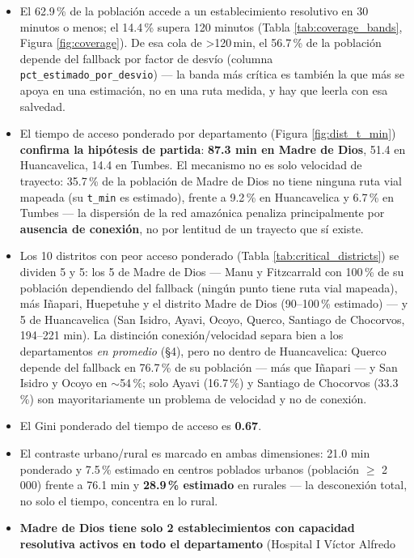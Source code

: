\documentclass[11pt]{article}
\begin{document}
\begin{itemize}
\item El 62.9\,\% de la población accede a un establecimiento resolutivo en
  30 minutos o menos; el 14.4\,\% supera 120 minutos (Tabla
  \ref{tab:coverage_bands}, Figura \ref{fig:coverage}). De esa cola de
  >120\,min, el 56.7\,\% de la población depende del fallback por factor de
  desvío (columna \texttt{pct\_estimado\_por\_desvio}) --- la banda más
  crítica es también la que más se apoya en una estimación, no en una ruta
  medida, y hay que leerla con esa salvedad.
\item El tiempo de acceso ponderado por departamento (Figura
  \ref{fig:dist_t_min}) \textbf{confirma la hipótesis de partida}:
  \textbf{87.3 min en Madre de Dios}, 51.4 en Huancavelica, 14.4 en Tumbes.
  El mecanismo no es solo velocidad de
  trayecto: 35.7\,\% de la población de Madre de Dios no tiene ninguna ruta
  vial mapeada (su \texttt{t\_min} es estimado), frente a 9.2\,\% en
  Huancavelica y 6.7\,\% en Tumbes --- la dispersión de la red amazónica
  penaliza principalmente por \textbf{ausencia de conexión}, no por
  lentitud de un trayecto que sí existe.
\item Los 10 distritos con peor acceso ponderado (Tabla
  \ref{tab:critical_districts}) se dividen 5 y 5: los 5 de Madre de Dios
  --- Manu y Fitzcarrald con 100\,\% de su población dependiendo del
  fallback (ningún punto tiene ruta vial mapeada), más Iñapari, Huepetuhe y
  el distrito Madre de Dios (90--100\,\% estimado) --- y 5 de Huancavelica
  (San Isidro, Ayavi, Ocoyo, Querco, Santiago de Chocorvos, 194--221 min).
  La distinción conexión/velocidad separa bien a los departamentos
  \emph{en promedio} (\S4), pero no dentro de Huancavelica: Querco depende
  del fallback en 76.7\,\% de su población --- más que Iñapari --- y San
  Isidro y Ocoyo en ${\sim}$54\,\%; solo Ayavi (16.7\,\%) y Santiago de
  Chocorvos (33.3\,\%) son mayoritariamente un problema de velocidad y no
  de conexión.
\item El Gini ponderado del tiempo de acceso es \textbf{0.67}.
\item El contraste urbano/rural es marcado en ambas dimensiones: 21.0 min
  ponderado y 7.5\,\% estimado en centros poblados urbanos (población
  $\geq$ 2\,000) frente a 76.1 min y \textbf{28.9\,\% estimado} en rurales
  --- la desconexión total, no solo el tiempo, concentra en lo rural.
\item \textbf{Madre de Dios tiene solo 2 establecimientos con capacidad
  resolutiva activos en todo el departamento} (Hospital I Víctor Alfredo

\end{itemize}
\end{document}
